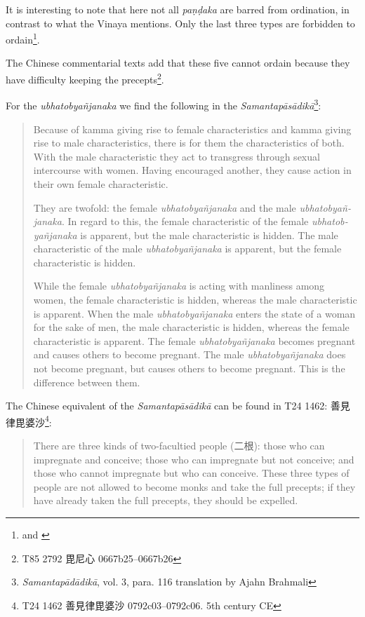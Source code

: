 It is interesting to note that here not all {\em paṇḍaka} are barred from ordination, in contrast to what the Vinaya mentions. Only the last three types are forbidden to ordain\footnote{\cite{wong} and \cite{thanissaro}}.

The Chinese commentarial texts add that these five cannot ordain because they have difficulty keeping the precepts\footnote{T85 2792 毘尼心 0667b25–0667b26}.

For the {\em ubhatob­yañ­janaka} we find the following in the {\em Samantapāsādikā}\footnote{{\em Samantapādādikā}, vol. 3, para. 116 translation by Ajahn Brahmali}:

\begin{quote}
Because of kamma giving rise to female characteristics and kamma giving rise to male characteristics, there is for them the characteristics of both. With the male characteristic they act to transgress through sexual intercourse with women. Having encouraged another, they cause action in their own female characteristic. 

They are twofold: the female {\em ubhatob­yañ­janaka} and the male {\em ubhatob­yañ­janaka}. In regard to this, the female characteristic of the female {\em ubhatob­yañ­janaka} is apparent, but the male characteristic is hidden. The male characteristic of the male {\em ubhatob­yañ­janaka} is apparent, but the female characteristic is hidden. 

While the female {\em ubhatob­yañ­janaka} is acting with manliness among women, the female characteristic is hidden, whereas the male characteristic is apparent. 
When the male {\em ubhatob­yañ­janaka} enters the state of a woman for the sake of men, the male characteristic is hidden, whereas the female characteristic is apparent. 
The female {\em ubhatob­yañ­janaka} becomes pregnant and causes others to become pregnant. The male {\em ubhatob­yañ­janaka} does not become pregnant, but causes others to become pregnant. This is the difference between them.
\end{quote}

The Chinese equivalent of the {\em Samantapāsādikā} can be found in T24 1462: 善見律毘婆沙\footnote{T24 1462 善見律毘婆沙 0792c03–0792c06. 5th century CE}:
\begin{quote}
There are three kinds of two-facultied people (二根): those who can impregnate and conceive; those who can impregnate but not conceive; and those who cannot impregnate but who can conceive. These three types of people are not allowed to become monks and take the full precepts; if they have already taken the full precepts, they should be expelled.
\end{quote}

